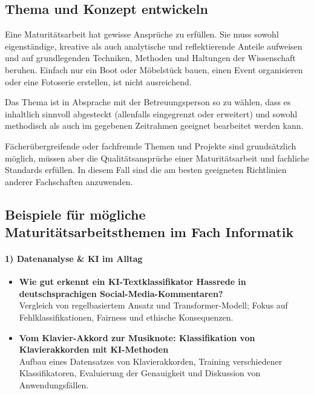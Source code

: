 \begin{myExBox}
\subsection*{Thema und Konzept entwickeln}

Eine Maturitätsarbeit hat gewisse Ansprüche zu erfüllen. Sie muss sowohl eigenständige,
kreative als auch analytische und reflektierende Anteile aufweisen und auf grundlegenden
Techniken, Methoden und Haltungen der Wissenschaft beruhen. Einfach nur ein Boot oder
Möbelstück bauen, einen Event organisieren oder eine Fotoserie erstellen, ist nicht ausreichend.

Das Thema ist in Absprache mit der Betreuungsperson so zu wählen, dass es inhaltlich sinnvoll
abgesteckt (allenfalls eingegrenzt oder erweitert) und sowohl methodisch als auch im gegebenen
Zeitrahmen geeignet bearbeitet werden kann.

Fächerübergreifende oder fachfremde Themen und Projekte sind grundsätzlich möglich, müssen
aber die Qualitätsansprüche einer Maturitätsarbeit und fachliche Standards erfüllen. In diesem
Fall sind die am besten geeigneten Richtlinien anderer Fachschaften anzuwenden.

\end{myExBox}
\newpage
\subsection*{Beispiele für mögliche Maturitätsarbeitsthemen im Fach Informatik}

\paragraph{1) Datenanalyse \& KI im Alltag}
\begin{itemize}
    \item \textbf{Wie gut erkennt ein KI-Textklassifikator Hassrede in deutschsprachigen Social-Media-Kommentaren?}\\
    Vergleich von regelbasiertem Ansatz und Transformer-Modell; Fokus auf Fehlklassifikationen, Fairness und ethische Konsequenzen.
    \item[\faStar] \textbf{Vom Klavier-Akkord zur Musiknote: Klassifikation von Klavierakkorden mit KI-Methoden}\\
    Aufbau eines Datensatzes von Klavierakkorden, Training verschiedener Klassifikatoren, Evaluierung der Genauigkeit und Diskussion von Anwendungsfällen.
\end{itemize}

